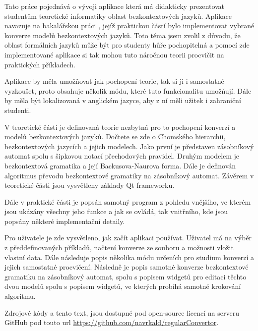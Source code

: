 
Tato práce pojednává o vývoji aplikace která má didakticky prezentovat studentům teoretické informatiky oblast bezkontextových jazyků. Aplikace navazuje na bakalářskou práci \cite{bakalarka} , jejíž praktickou částí bylo implementovat vybrané konverze modelů bezkontextových jazyků. Toto téma jsem zvolil z důvodu, že oblast formálních jazyků může být pro studenty hůře pochopitelná a pomocí zde implementované aplikace si tak mohou tuto náročnou teorii procvičit na praktických příkladech.

Aplikace by měla umožňovat jak pochopení teorie, tak si ji i samostatně vyzkoušet, proto obsahuje několik módu, které tuto funkcionalitu umožňují. Dále by měla být lokalizovaná v anglickém jazyce, aby z ní měli užitek i zahraniční studenti.

V teoretické části je definovaná teorie nezbytná pro to pochopení konverzí a modelů bezkontextových jazyků. Dočtete se zde o Chomského hierarchii, bezkontextových jazycích a jejich modelech. Jako první je představen zásobníkový automat spolu s šipkovou notací přechodových pravidel. Druhým modelem je bezkontextová gramatika a její Backusova-Naurova forma. Dále je definován algoritmus převodu bezkontextové gramatiky na zásobníkový automat. Závěrem v teoretické části jsou vysvětleny základy Qt frameworku.

Dále v praktické části je popsán samotný program z pohledu vnějšího, ve kterém jsou ukázány všechny jeho funkce a jak se ovládá, tak vnitřního, kde jsou popsány některé implementační detaily.

Pro uživatele je zde vysvětleno, jak začít aplikaci používat. Uživatel má na výběr z předdefinovaných příkladů, načtení konverze ze souboru a možnosti vložit vlastní data. Dále následuje popis několika módu určeních pro studium konverzí a jejich samostatné procvičení. Následně je popis samotné konverze bezkontextové gramatiku na zásobníkový automat, spolu s popisem widgetů pro editaci těchto dvou modelů spolu s popisem widgetů, ve kterých probíhá samotné krokování algoritmu. 

Zdrojové kódy a tento text, jsou dostupné pod open-source licencí na serveru GitHub pod touto url \url{https://github.com/navrkald/regularConvertor}.

